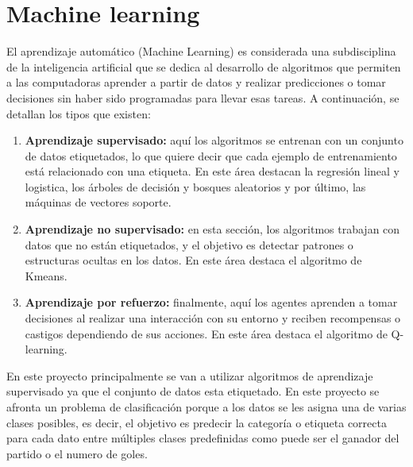 \section{Machine learning}
El aprendizaje automático (Machine Learning) es considerada una subdisciplina de la inteligencia artificial que se dedica al desarrollo de algoritmos que permiten a las computadoras aprender a partir de datos y realizar predicciones o tomar decisiones sin haber sido programadas para llevar esas tareas. A continuación, se detallan los tipos que existen:
\begin{enumerate}
    \item \textbf{Aprendizaje supervisado:} aquí los algoritmos se entrenan con un conjunto de datos etiquetados, lo que quiere decir que cada ejemplo de entrenamiento está relacionado con una etiqueta. En este área destacan la regresión lineal y logistica, los árboles de decisión y bosques aleatorios y por último, las máquinas de vectores soporte.
    \item \textbf{Aprendizaje no supervisado:} en esta sección, los algoritmos trabajan con datos que no están etiquetados, y el objetivo es detectar patrones o estructuras ocultas en los datos. En este área destaca el algoritmo de Kmeans.
    \item \textbf{Aprendizaje por refuerzo:} finalmente, aquí los agentes aprenden a tomar decisiones al realizar una interacción con su entorno y reciben recompensas o castigos dependiendo de sus acciones. En este área destaca el algoritmo de Q-learning.
\end{enumerate}


En este proyecto principalmente se van a utilizar algoritmos de aprendizaje supervisado ya que el conjunto de datos esta etiquetado. En este proyecto se afronta un problema de clasificación porque a los datos se les asigna una de varias clases posibles, es decir, el objetivo es predecir la categoría o etiqueta correcta para cada dato entre múltiples clases predefinidas como puede ser el ganador del partido o el numero de goles.

